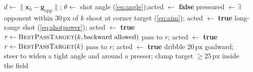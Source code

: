 \documentclass[10pt,twocolumn]{article}
\newcommand{\px}{\ensuremath{\,\mathrm{px}}}
\begin{document}
\begin{algorithm}[t]
\caption{Carrier decision policy (one frame, carrier $k$).}
\label{alg:carrier}
\begin{algorithmic}[1]
\State $d \gets \lVert \mathbf x_k - \mathbf g_{\text{opp}} \rVert$;\quad
$\theta \gets$ shot angle (\cref{eq:angle});\quad acted $\gets$ \textbf{false}
\State pressured $\gets \exists$ opponent within $30\px$ of $k$
   \State shoot at corner target (\cref{eq:aim}); acted $\gets$ \textbf{true}
   \State long-range shot (\cref{eq:shotpower}); acted $\gets$ \textbf{true}
   \State $r \gets \textsc{BestPassTarget}(k, \text{backward allowed})$
    pass to $r$; acted $\gets$ \textbf{true}
   \EndIf
   \State $r \gets \textsc{BestPassTarget}(k)$ 
    pass to $r$; acted $\gets$ \textbf{true}
   \EndIf
 \EndIf
\EndIf
{}
  \State dribble $20\px$ goalward; steer to widen a tight angle and
         around a presser; clamp target $\ge 25\px$ inside the field
\EndIf
\end{algorithmic}
\end{algorithm}
\end{document}
